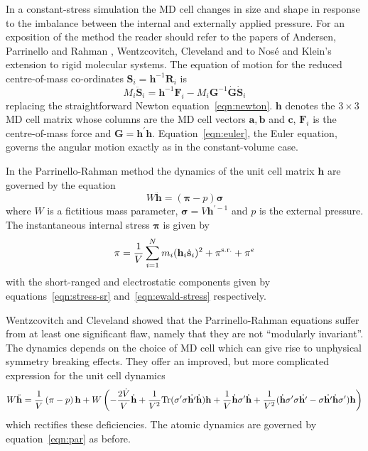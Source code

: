 \documentclass[a4paper,twoside]{report}
\providecommand{\bm}[1]{\mathbf{#1}}
\begin{document}
In a constant-stress simulation the MD cell changes in size and shape
in response to the imbalance between the internal and externally
applied pressure.  For an exposition of the method the reader should
refer to the papers of Andersen\cite{andersen:80}, Parrinello and
Rahman \cite{parrinello:81}, Wentzcovitch\cite{wentzcovitch:91},
Cleveland\cite{cleveland:88} and to Nos\'{e} and Klein's extension to
rigid molecular systems\cite{nose:83}.  The equation of motion for the
reduced centre-of-mass co-ordinates $\bm{S}_i = \bm{h}^{-1}\bm{R}_i$
is
\begin{equation}
\label{eqn:par}
M_i\ddot{\bm{S}}_i = \bm{h}^{-1} \bm{F}_i - M_i \bm{G}^{-1}\dot{\bm{G}}\dot{\bm{S}}_i
\end{equation}
replacing the straightforward Newton equation~\ref{eqn:newton}.
$\bm{h}$ denotes the $3 \times 3$ MD cell matrix whose columns are
the MD cell vectors $\bm{a}, \bm{b}$ and $\bm{c}$, $\bm{F}_i$ is the
centre-of-mass force and $\bm{G} =\bm{h^\prime h}$.
Equation~\ref{eqn:euler}, the Euler equation, governs the angular
motion exactly as in the constant-volume case.

In the Parrinello-Rahman method the dynamics of the unit cell matrix
$\bm{h}$ are governed by the equation
\begin{equation}
\label{eqn:rahman}
W\ddot{\bm{h}} = \left ( \bm{\pi} - p \right ) \bm{\sigma}
\end{equation}
where $W$ is a fictitious mass parameter, $\bm{\sigma} = V
\bm{h}^{\prime-1}$ and $p$ is the external pressure.  The
instantaneous internal stress $\bm{\pi}$ is given by 
\begin{equation}
\label{eqn:prstress}
\bm{\pi} = \frac{1}{V}\sum_{i=1}^N m_i (\bm{h}_i\dot{\bm{s}}_i)^2 +
\bm{\pi}^{\textnormal{s.r.}} + \bm{\pi}^e 
\end{equation}
with the short-ranged and electrostatic components given by
equations~\ref{eqn:stress-sr} and~\ref{eqn:ewald-stress} respectively.

Wentzcovitch\cite{wentzcovitch:91} and Cleveland\cite{cleveland:88}
showed that the Parrinello-Rahman equations suffer from at least one
significant flaw, namely that they are not ``modularly invariant''.
The dynamics depends on the choice of MD cell which can give rise
to unphysical symmetry breaking effects.  They offer an improved, but
more complicated expression for the unit cell dynamics
\begin{equation}
  \label{eqn:wentzcovitch}
  W\ddot{\bm{h}} = \frac{1}{V}\left ( \bm{\pi} - p \right ) \bm{h} + W
  \left (
    -\frac{2 \dot{V}}{V} \dot{\bm{h}} + \frac{1}{V^2}\textnormal{Tr}(\bm{\sigma'} \bm{\sigma}
      \dot{\bm{h'}} \dot{\bm{h}} ) \bm{h} + \frac{1}{V} \dot{\bm{h}} \bm{\sigma'} \dot{\bm{h}}
      + \frac{1}{V^2} ( \dot{\bm{h}} \bm{\sigma' \sigma} \dot{\bm{h'}} - \bm{\sigma} \dot{\bm{h'}}
      \dot{\bm{h}} \bm{\sigma'}) \bm{h}
  \right )
\end{equation}
which rectifies these deficiencies.  The atomic dynamics are governed
by equation~\ref{eqn:par} as before.
\end{document}
